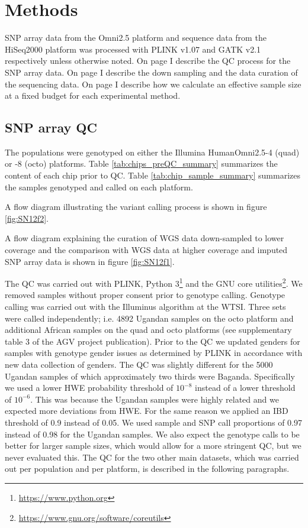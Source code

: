 \section{Methods}

SNP array data from the Omni2.5 platform and sequence data from the HiSeq2000 platform was processed with PLINK v1.07\cite{Purcell2007} and \gls{GATK} v2.1 respectively unless otherwise noted. On page \pageref{subsec:chipQC} I describe the QC process for the SNP array data. On page \pageref{subsec:sequence} I describe the down sampling and the data curation of the sequencing data. On page \pageref{subsec:samplesize} I describe how we calculate an effective sample size at a fixed budget for each experimental method.

\subsection{SNP array QC}
\label{subsec:chipQC}
The populations were genotyped on either the Illumina HumanOmni2.5-4 (quad) or -8 (octo) platforms. Table \ref{tab:chips_preQC_summary} summarizes the content of each chip prior to QC. Table \ref{tab:chip_sample_summary} summarizes the samples genotyped and called on each platform.



A flow diagram illustrating the variant calling process is shown in figure \ref{fig:SN12f2}.


A flow diagram explaining the curation of \gls{WGS} data down-sampled to lower coverage and the comparison with \gls{WGS} data at higher coverage and imputed SNP array data is shown in figure \ref{fig:SN12f1}.


The \gls{QC} was carried out with PLINK\cite{Purcell2007}, Python 3\footnote{\url{https://www.python.org}} and the GNU core utilities\footnote{\url{https://www.gnu.org/software/coreutils}}. We removed samples without proper consent prior to genotype calling. Genotype calling was carried out with the Illuminus algorithm at the \gls{WTSI}. Three sets were called independently; i.e. 4892 Ugandan samples on the octo platform and additional African samples on the quad and octo platforms (see supplementary table 3 of the AGV project publication\cite{Gurdasani2015}). Prior to the \gls{QC} we updated genders for samples with genotype gender issues as determined by PLINK in accordance with new data collection of genders. The QC was slightly different for the 5000 Ugandan samples of which approximately two thirds were Baganda. Specifically we used a lower \gls{HWE} probability threshold of $10^{-8}$ instead of a lower threshold of $10^{-6}$. This was because the Ugandan samples were highly related and we expected more deviations from \gls{HWE}. For the same reason we applied an IBD threshold of 0.9 instead of 0.05. We used sample and SNP call proportions of 0.97 instead of 0.98 for the Ugandan samples. We also expect the genotype calls to be better for larger sample sizes, which would allow for a more stringent QC, but we never evaluated this. The QC for the two other main datasets, which was carried out per population and per platform, is described in the following paragraphs.

